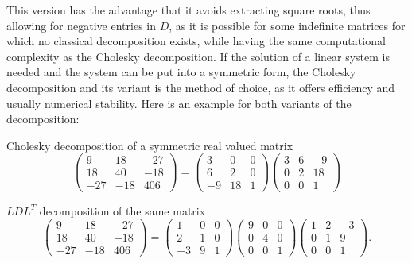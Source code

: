 \noindent This version has the advantage that it avoids extracting
square roots, thus allowing for negative entries in $D$, as it is
possible for some indefinite matrices for which no classical
decomposition exists, while having the same computational complexity as
the Cholesky decomposition. If the solution of a linear system is needed
and the system can be put into a symmetric form, the Cholesky
decomposition and its variant is the method of choice, as it offers
efficiency and usually numerical stability. Here is an example for both
variants of the decomposition:\\
\begin{inparaenum}[]
  \item Cholesky decomposition of a symmetric real valued matrix
  \begin{equation}
    \begin{pmatrix}
      9 & 18 & -27\\
      18 & 40 & -18 \\
      -27 & -18 & 406
    \end{pmatrix}
    =
    \begin{pmatrix}
      3 & 0 & 0\\
      6 & 2 & 0 \\
      -9 & 18 & 1
    \end{pmatrix}
    \begin{pmatrix}
      3 & 6 & -9\\
      0 & 2 & 18 \\
      0 & 0 & 1
    \end{pmatrix}
  \end{equation}
  \item $LDL^T$ decomposition of the same matrix
  \begin{equation}
    \begin{pmatrix}
      9 & 18 & -27\\
      18 & 40 & -18 \\
      -27 & -18 & 406
    \end{pmatrix}
    =
    \begin{pmatrix}
      1 & 0 & 0\\
      2 & 1 & 0 \\
      -3 & 9 & 1
    \end{pmatrix}
    \begin{pmatrix}
      9 & 0 & 0\\
      0 & 4 & 0 \\
      0 & 0 & 1
    \end{pmatrix}
    \begin{pmatrix}
      1 & 2 & -3\\
      0 & 1 & 9 \\
      0 & 0 & 1
    \end{pmatrix}
    .
  \end{equation}
\end{inparaenum}

